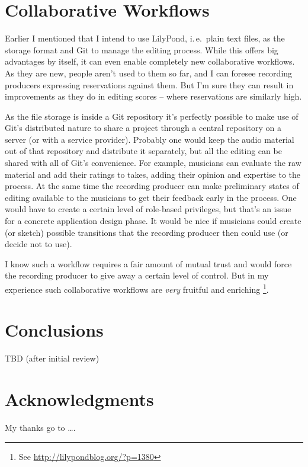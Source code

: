 \documentclass[11pt,a4paper]{article}
\begin{document}
\section{Collaborative Workflows}

Earlier I mentioned that I intend to use LilyPond, i.\,e.\ plain text files, as
the storage format and Git to manage the editing process.
While this offers big advantages by itself, it can even enable completely new
collaborative workflows.
As they are new, people aren't used to them so far, and I can foresee recording
producers expressing reservations against them.
But I'm sure they can result in improvements as they do in editing scores -- where
reservations are similarly high.

As the file storage is inside a Git repository it's perfectly possible to make
use of Git's distributed nature to share a project through a central repository
on a server (or with a service provider).
Probably one would keep the audio material out of that repository and distribute
it separately, but all the editing can be shared with all of Git's convenience.
For example, musicians can evaluate the raw material and add their ratings to
takes, adding their opinion and expertise to the process.
At the same time the recording producer can make preliminary states of editing
available to the musicians to get their feedback early in the process.
One would have to create a certain level of role-based privileges, but that's an
issue for a concrete application design phase.
It would be nice if musicians could create (or sketch) possible transitions that
the recording producer then could use (or decide not to use).

I know such a workflow requires a fair amount of mutual trust and would force the
recording producer to give away a certain level of control.
But in my experience such collaborative workflows are \emph{very} fruitful and
enriching%
\footnote{See \url{http://lilypondblog.org/?p=1380}}.


\section{Conclusions}

TBD (after initial review)


\section{Acknowledgments}

My thanks go to \ldots .
\end{document}
